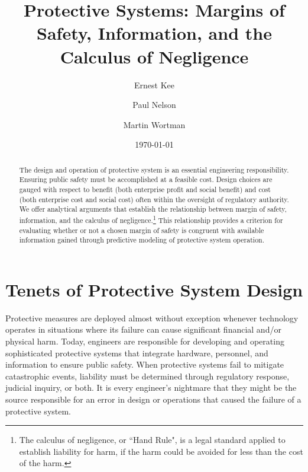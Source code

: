 \documentclass[12pt]{article}
\author[1]{Ernest Kee}
\author[1]{Paul Nelson}
\affil[1]{Department of Nuclear Engineering}
\author[2]{Martin Wortman}
\affil[2]{Department of Industrial \& System Engineering\\
Texas A\&M University}
\date{\today}
\title{Protective Systems: Margins of Safety,  Information, and the Calculus of Negligence}
\begin{document}
\maketitle
\begin{abstract}
The design and operation of protective system is an essential engineering responsibility.  Ensuring public safety must be accomplished at a feasible cost. Design choices are gauged with respect to benefit (both enterprise profit and social benefit) and cost (both enterprise cost and social cost) often within the oversight of regulatory authority. We offer analytical arguments that establish the relationship between margin of safety, information, and the calculus of negligence.\footnote{The calculus of negligence, or ``Hand Rule", is a legal standard applied to establish liability  for harm, if the harm could be avoided for less than the cost of the harm.}  This relationship provides a criterion for evaluating whether or not a chosen margin of safety is congruent with available information gained through predictive modeling of protective system operation.


\end{abstract}

\pagebreak
\doublespacing

\section{Tenets of Protective System Design}

Protective measures are deployed almost without exception whenever technology operates in situations where its failure can cause significant financial and/or physical harm.  Today, engineers are responsible for developing and operating sophisticated protective systems that integrate hardware, personnel, and information to ensure public safety. 
When protective systems fail to mitigate catastrophic events, liability must be determined through regulatory response, judicial inquiry, or both. 
It is every engineer's nightmare that they might be the source responsible for an error in design or operations that caused the failure of a protective system.

\end{document}
